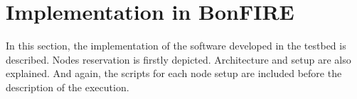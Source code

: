 \section{Implementation in BonFIRE}

In this section, the implementation of the software
developed in the \bonfire testbed is described. Nodes reservation is firstly
depicted. Architecture and setup are also explained. And again, the
scripts for each node setup are included before the description of the
execution.


